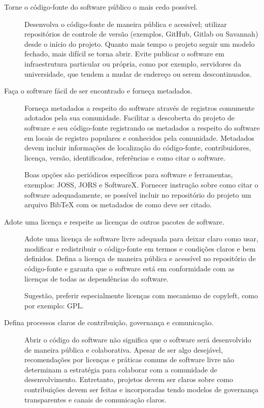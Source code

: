\begin{description}
  \item [Torne o código-fonte do software público o mais cedo possível.]

    Desenvolva o código-fonte de maneira pública e acessível; utilizar
    repositórios de controle de versão (exemplos, GitHub, Gitlab ou Savannah)
    desde o início do projeto. Quanto mais tempo o projeto seguir um modelo
    fechado, mais difícil se torna abrir. Evite publicar o software em
    infraestrutura particular ou própria, como por exemplo, servidores da
    universidade, que tendem a mudar de endereço ou serem descontinuados.

  \item [Faça o software fácil de ser encontrado e forneça metadados.]

    Forneça metadados a respeito do software através de registros comumente
    adotados pela sua comunidade. Facilitar a descoberta do projeto de software
    e seu código-fonte registrando os metadados a respeito do software em
    locais de registro populares e conhecidos pela comunidade. Metadados devem
    incluir informações de localização do código-fonte, contribuidores,
    licença, versão, identificados, referências e como citar o software.

    Boas opções são periódicos específicos para software e ferramentas, exemplos:
    JOSS, JORS e SoftwareX. Fornecer instrução sobre como citar o software
    adequadamente, se possível incluir no repositório do projeto um arquivo
    BibTeX com os metadados de como deve ser citado.

  \item [Adote uma licença e respeite as licenças de outros pacotes de software.]

    Adote uma licença de software livre adequada para deixar claro como usar,
    modificar e redistribuir o código-fonte em termos e condições claros e bem
    definidos. Defina a licença de maneira pública e acessível no repositório
    de código-fonte e garanta que o software está em conformidade com as
    licenças de todas as dependências do software.

    Sugestão, preferir especialmente licenças com mecanismo de copyleft, como
    por exemplo: GPL.

  \item [Defina processos claros de contribuição, governança e comunicação.]

    Abrir o código do software não significa que o software será desenvolvido
    de maneira pública e colaborativa. Apesar de ser algo desejável,
    recomendações por licenças e práticas comuns de software livre não
    determinam a estratégia para colaborar com a comunidade de desenvolvimento.
    Entretanto, projetos devem ser claros sobre como contribuições devem ser
    feitas e incorporadas tendo modelos de governança transparentes e canais de
    comunicação claros.

\end{description}

